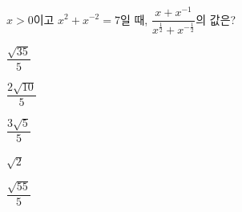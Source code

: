 $x>0$이고 $x^2+x^{-2}=7$일 때, $\dfrac{x+x^{-1}}{x^{\frac{1}{2}}+x^{-\frac{1}{2}}}$의 값은?
\begin{choices32}{\rule[-3ex]{0pt}{8ex}$\dfrac{\sqrt{35}}{5}$}{\rule[-3ex]{0pt}{8ex}$\dfrac{2\sqrt{10}}{5}$}{\rule[-3ex]{0pt}{8ex}$\dfrac{3\sqrt{5}}{5}$}{\rule[-3ex]{0pt}{8ex}$\sqrt{2}$}{\rule[-3ex]{0pt}{8ex}$\dfrac{\sqrt{55}}{5}$}\end{choices32}
